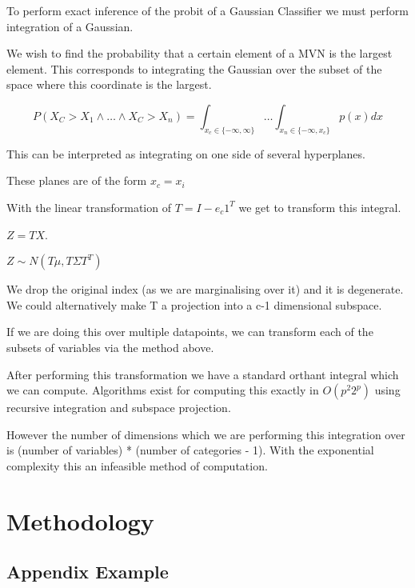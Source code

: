 \documentclass[12pt, a4paper]{report}
\begin{document}
To perform exact inference of the probit of a Gaussian Classifier we must perform integration of a Gaussian.

We wish to find the probability that a certain element of a MVN is the largest element. This corresponds to integrating the Gaussian over the subset of the space where this coordinate is the largest.

$$P(X_C > X_1 \land \ldots \land X_C > X_n) = \int_{x_c \in \{ -\infty, \infty \} } \ldots \int_{x_n \in \{ -\infty , x_c \}} p(x) dx$$

This can be interpreted as integrating on one side of several hyperplanes.

These planes are of the form $x_c = x_i$

With the linear transformation of $T = I - e_c 1^T$ we get to transform this integral.

$Z = TX$.

$Z \sim N(T \mu, T \Sigma T^T)$

We drop the original index (as we are marginalising over it) and it is degenerate. We could alternatively make T a projection into a c-1 dimensional subspace.

If we are doing this over multiple datapoints, we can transform each of the subsets of variables via the method above.

After performing this transformation we have a standard orthant integral which we can compute. Algorithms exist for computing this exactly in $O(p^2 2^p)$ using recursive integration and subspace projection. \cite{orthant}


However the number of dimensions which we are performing this integration over is (number of variables) * (number of categories - 1). With the exponential complexity this an infeasible method of computation.

\chapter{Methodology}
\label{Chap6}

\renewcommand{\bibname}{Bibliography}



\begin{appendices}
\chapter{Appendix Example}
\end{appendices}
\end{document}

